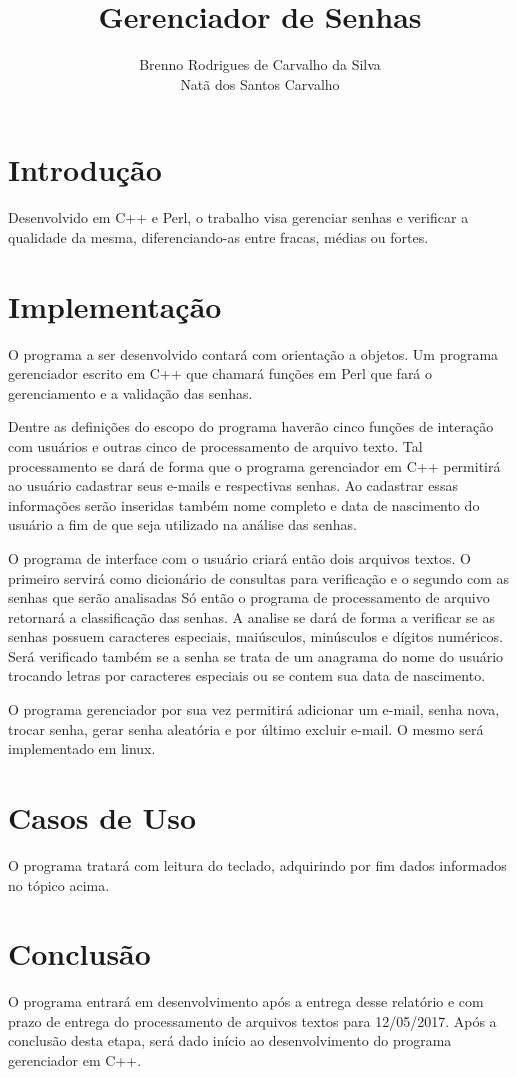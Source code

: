 \documentclass[
article,			%
11pt,				%
oneside,			%
a4paper,			%
english,			%
brazil,				%
sumario=tradicional
]{abntex2}
\title{\textbf{Gerenciador de Senhas}}
\author{Brenno Rodrigues de Carvalho da Silva\\ Natã dos Santos Carvalho}
\begin{document}
\frenchspacing 
\maketitle

\section{Introdução}
Desenvolvido em C++ e Perl, o trabalho visa gerenciar senhas e 
verificar a qualidade da mesma, diferenciando-as entre fracas, médias 
ou fortes.

\section{Implementação}
O programa a ser desenvolvido contará com orientação a objetos. Um programa gerenciador escrito em C++ que chamará funções em Perl que fará o gerenciamento e a validação das senhas.

Dentre as definições do escopo do programa haverão cinco funções de 
interação com usuários e outras cinco de processamento de arquivo texto. 
Tal processamento se dará de forma que o programa gerenciador
em C++ permitirá ao usuário cadastrar seus e-mails e respectivas senhas. 
Ao cadastrar essas informações serão inseridas também
nome completo e data de nascimento do usuário a fim de que seja utilizado na análise das senhas.
 
O programa de interface com o usuário criará então dois arquivos textos. 
O primeiro servirá como dicionário de consultas para verificação e o segundo com as senhas que serão analisadas Só então o programa de processamento de arquivo retornará a classificação das senhas. A analise se dará de forma a verificar se as senhas possuem caracteres especiais, maiúsculos, minúsculos e dígitos  numéricos. Será verificado também se a senha se trata de um anagrama do nome do usuário trocando letras por caracteres especiais ou se contem sua data de nascimento. 

O programa gerenciador por sua vez permitirá adicionar um e-mail, senha nova, trocar senha, gerar senha aleatória e por último excluir e-mail. O mesmo será implementado em linux. 

\section{Casos de Uso}
O programa tratará com leitura do teclado, adquirindo por fim 
dados informados no tópico acima. 

\section{Conclusão}
O programa entrará em desenvolvimento após a entrega desse relatório e com prazo de entrega do processamento de arquivos textos para 12/05/2017. Após a conclusão desta etapa, será dado início ao desenvolvimento do programa gerenciador em C++.
\end{document}
